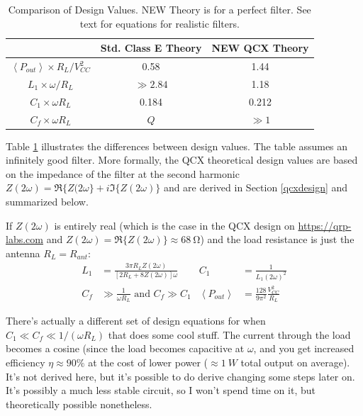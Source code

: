 \documentclass[10pt,letterpaper]{article}
\begin{document}
\begin{table}
\centering
\begin{tabular}{c|cc}
& Std. Class E Theory & NEW QCX Theory \\
\hline
\hline 
$\left\langle P_{out} \right\rangle \times R_L/V_{CC}^2$ & 0.58 & 1.44 \\ \hline
$L_1 \times \omega/ R_L$ & $\gg 2.84$ & 1.18 \\ \hline
$C_1 \times \omega R_L$ & 0.184 & 0.212 \\ \hline
$C_f \times \omega R_L$ & $Q$ & $ \gg 1$ \\ \hline
\end{tabular}
\caption{Comparison of Design Values. NEW Theory is for a perfect filter. See text for equations for realistic filters.}\label{designcomparetable}
\end{table}

Table \ref{designcomparetable} illustrates the differences between design values. The table assumes an infinitely good filter. More formally, the QCX theoretical design values are based on the impedance of the filter at the second harmonic $Z(2\omega)=\Re\{Z(2\omega\}+i\Im\{Z(2\omega)\}$ and are derived in Section \ref{qcxdesign} and summarized below.


If $Z(2\omega)$ is entirely real (which is the case in the QCX design on \url{https://qrp-labs.com} and $Z(2\omega)=\Re\{Z(2\omega)\}\approx\SI{68}{\ohm}$) and the load resistance is just the antenna $R_L=R_{ant}$:
\begin{align*}
L_1&=\frac{3 \pi R_L Z(2\omega) }{[2R_L+8Z(2\omega)]\omega}
& C_1&=\frac{1}{L_1 (2\omega)^2}\\
C_f &\gg \frac{1}{\omega R_L} \text{ and } C_f \gg C_1
& \left\langle P_{out} \right\rangle & = \frac{128}{9\pi^2}\frac{V_{CC}^2}{R_L}
\end{align*}

There's actually a different set of design equations for when $C_1 \ll C_f \ll 1/(\omega R_L)$ that does some cool stuff. The current through the load becomes a cosine (since the load becomes capacitive at $\omega$, and you get increased efficiency $\eta \approx 90\%$ at the cost of lower power ($\approx \SI{1}{W}$ total output on average). It's not derived here, but it's possible to do derive changing some steps later on. It's possibly a much less stable circuit, so I won't spend time on it, but theoretically possible nonetheless.
\end{document}
